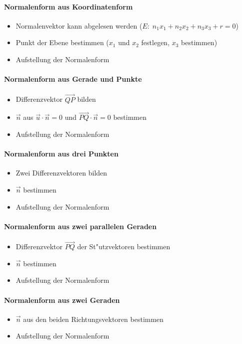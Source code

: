 \documentclass[a4paper]{article}
\begin{document}
\paragraph{Normalenform aus Koordinatenform}
\begin{itemize}
\item Normalenvektor kann abgelesen werden ($E:\; n_1x_1 + n_2 x_2 + n_3x_3+r=0$)
\item Punkt der Ebene bestimmen ($x_1$ und $x_2$ festlegen, $x_3$ bestimmen)
\item Aufstellung der Normalenform
\end{itemize}

\paragraph{Normalenform aus Gerade und Punkte}
\begin{itemize}
\item Differenzvektor $\vec{QP}$ bilden
\item $\vec{n}$ aus $\vec{u} \cdot \vec{n} = 0$ und $\vec{PQ} \cdot \vec{n} = 0$ bestimmen
\item Aufstellung der Normalenform
\end{itemize}


\paragraph{Normalenform aus drei Punkten}
\begin{itemize}
\item Zwei Differenzvektoren bilden
\item $\vec{n}$ bestimmen
\item Aufstellung der Normalenform
\end{itemize}

\paragraph{Normalenform aus zwei parallelen Geraden}
\begin{itemize}
\item Differenzvektor $\vec{PQ}$ der St"utzvektoren bestimmen
\item $\vec{n}$ bestimmen
\item Aufstellung der Normalenform
\end{itemize}

\paragraph{Normalenform aus zwei Geraden}
\begin{itemize}
\item $\vec{n}$ aus den beiden Richtungsvektoren bestimmen
\item Aufstellung der Normalenform
\end{itemize}
\end{document}
